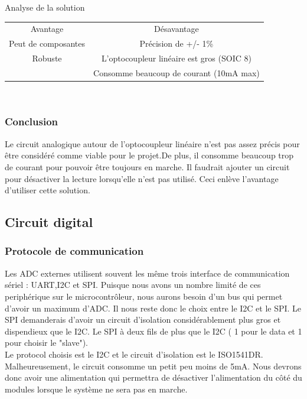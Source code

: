 \documentclass[12pt,letterpaper]{article}
\begin{document}
\begin{normalsize}
\begin{center}
					Analyse de la solution \\ \vspace{0.25cm}
					\begin{tabular}{|c|c|}
						\hline
						Avantage & D\'{e}savantage\\ \hhline{|=|=|}
						Peut de composantes & Pr\'{e}cision de +/- 1\% \\ \hline
						Robuste & L'optocoupleur lin\'{e}aire est gros (SOIC 8)\\ \hline
						 & Consomme beaucoup de courant (10mA max)\\ \hline
					\end{tabular} \\ \vspace{0.5cm}
				\end{center} 
				\subsubsection{Conclusion}
				Le circuit analogique autour de l'optocoupleur lin\'{e}aire n'est pas assez pr\'{e}cis pour \^{e}tre consid\'{e}r\'{e} comme viable pour le projet.De plus, il consomme beaucoup trop de courant pour pouvoir \^{e}tre toujours en marche. Il faudrait ajouter un circuit pour d\'{e}sactiver la lecture lorsqu'elle n'est pas utilis\'{e}. Ceci enl\`{e}ve l'avantage d'utiliser cette solution. 
				\newpage
				
			\subsection{Circuit digital}
				\subsubsection{Protocole de communication}
					Les ADC externes utilisent souvent les m\^{e}me trois interface de communication s\'{e}riel : UART,I2C et SPI. Puisque nous avons un nombre limit\'{e} de ces periph\'{e}rique sur le microcontr\^{o}leur, nous aurons besoin d'un bus qui permet d'avoir un maximum d'ADC. Il nous reste donc le choix entre le I2C et le SPI. Le SPI demanderais d'avoir un circuit d'isolation consid\'{e}rablement plus gros et dispendieux que le I2C. Le SPI \`{a} deux fils de plus que le I2C ( 1 pour le data et 1 pour choisir le "slave"). \\
					Le protocol choisis est le I2C et le circuit d'isolation est le ISO1541DR. Malheureusement, le circuit consomme un petit peu moins de 5mA. Nous devrons donc avoir une alimentation qui permettra de d\'{e}sactiver l'alimentation du c\^{o}t\'{e} du modules lorsque le syst\`{e}me ne sera pas en marche.
					

\end{normalsize}
\end{document}
